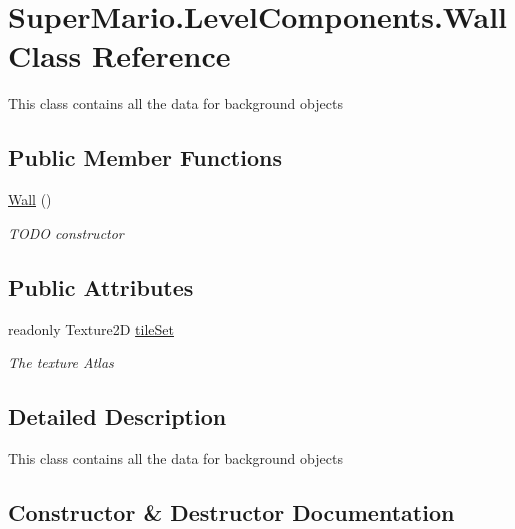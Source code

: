 \hypertarget{class_super_mario_1_1_level_components_1_1_wall}{}\section{Super\+Mario.\+Level\+Components.\+Wall Class Reference}
\label{class_super_mario_1_1_level_components_1_1_wall}


This class contains all the data for background objects  


\subsection*{Public Member Functions}
\begin{DoxyCompactItemize}
\item 
\mbox{\hyperlink{class_super_mario_1_1_level_components_1_1_wall_a8289646ed2e3bab70d6ed13144997318}{Wall}} ()
\begin{DoxyCompactList}\small\item\em T\+O\+DO constructor \end{DoxyCompactList}\end{DoxyCompactItemize}
\subsection*{Public Attributes}
\begin{DoxyCompactItemize}
\item 
readonly Texture2D \mbox{\hyperlink{class_super_mario_1_1_level_components_1_1_wall_a336f1410914c4832d5db575a8540183b}{tile\+Set}}
\begin{DoxyCompactList}\small\item\em The texture Atlas \end{DoxyCompactList}\end{DoxyCompactItemize}


\subsection{Detailed Description}
This class contains all the data for background objects 



\subsection{Constructor \& Destructor Documentation}
\mbox{\label{class_super_mario_1_1_level_components_1_1_wall_a8289646ed2e3bab70d6ed13144997318}} 
